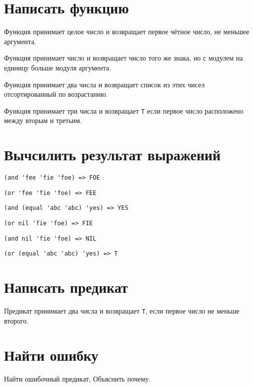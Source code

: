 
\section{Написать функцию}

\problem Функция принимает целое число и возвращает первое чётное число, не меньшее аргумента.



\problem Функция принимает число и возвращает число того же знака, но с модулем на единицу больше модуля аргумента.



\problem Функция принимает два числа и возвращает список из этих чисел отсортированный по возрастанию.



\problem Функция принимает три числа и возвращает \verb|T| если первое число расположено между вторым и третьим.




\section{Вычсилить результат выражений}

\problem \hfill
\begin{lstlisting}
(and 'fee 'fie 'foe) => FOE
\end{lstlisting}


\problem \hfill
\begin{lstlisting}
(or 'fee 'fie 'foe) => FEE
\end{lstlisting}


\problem \hfill
\begin{lstlisting}
(and (equal 'abc 'abc) 'yes) => YES
\end{lstlisting}


\problem \hfill
\begin{lstlisting}
(or nil 'fie 'foe) => FIE
\end{lstlisting}


\problem \hfill
\begin{lstlisting}
(and nil 'fie 'foe) => NIL
\end{lstlisting}


\problem \hfill
\begin{lstlisting}
(or (equal 'abc 'abc) 'yes) => T
\end{lstlisting}



\section{Написать предикат}

\problem
Предикат принимает два числа и возвращает \verb|T|, если первое число не меньше второго.




\section{Найти ошибку}

\problem Найти ошибочный предикат, Объяснить почему.